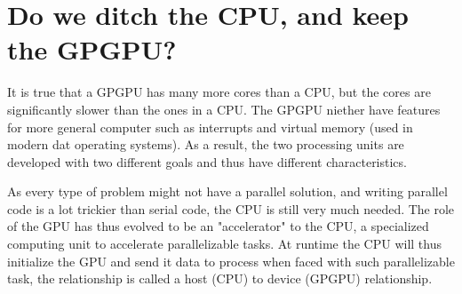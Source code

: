 \section{Do we ditch the CPU, and keep the GPGPU?}
\label{sec:cpu vs gpu}

It is true that a GPGPU has many more cores than a CPU, but the cores are significantly slower than the ones in a CPU.
The GPGPU niether have features for more general computer such as interrupts and virtual memory (used in modern dat operating systems).
As a result, the two processing units are developed with two different goals and thus have different characteristics.

As every type of problem might not have a parallel solution, and writing parallel code is a lot trickier than serial code, the CPU is still very much needed.
The role of the GPU has thus evolved to be an "accelerator" to the CPU, a specialized computing unit to accelerate parallelizable tasks.
At runtime the CPU will thus initialize the GPU and send it data to process when faced with such parallelizable task, the relationship is called a host (CPU) to device (GPGPU) relationship.
